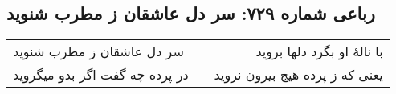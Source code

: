 \begin{center}
\section*{رباعی شماره ۷۲۹: سر دل عاشقان ز مطرب شنوید}
\label{sec:0729}
\begin{longtable}{l p{0.5cm} r}
سر دل عاشقان ز مطرب شنوید
&&
با نالهٔ او بگرد دلها بروید
\\
در پرده چه گفت اگر بدو میگروید
&&
یعنی که ز پرده هیچ بیرون نروید
\\
\end{longtable}
\end{center}
